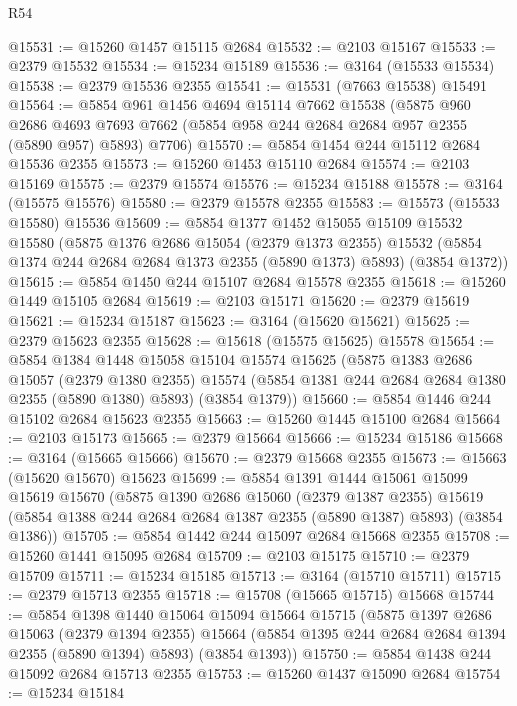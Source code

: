 \begin{lexlean}{R54}
\begin{coremodule}
@15531 := @15260 @1457 @15115 @2684
@15532 := @2103 @15167
@15533 := @2379 @15532
@15534 := @15234 @15189
@15536 := @3164 (@15533 @15534)
@15538 := @2379 @15536 @2355
@15541 := @15531 (@7663 @15538) @15491
@15564 := @5854
    @961
    @1456
    @4694
    @15114
    @7662
    @15538
    (@5875
      @960
      @2686
      @4693
      @7693
      @7662
      (@5854 @958 @244 @2684 @2684 @957 @2355 (@5890 @957) @5893)
      @7706)
@15570 := @5854 @1454 @244 @15112 @2684 @15536 @2355
@15573 := @15260 @1453 @15110 @2684
@15574 := @2103 @15169
@15575 := @2379 @15574
@15576 := @15234 @15188
@15578 := @3164 (@15575 @15576)
@15580 := @2379 @15578 @2355
@15583 := @15573 (@15533 @15580) @15536
@15609 := @5854
    @1377
    @1452
    @15055
    @15109
    @15532
    @15580
    (@5875
      @1376
      @2686
      @15054
      (@2379 @1373 @2355)
      @15532
      (@5854 @1374 @244 @2684 @2684 @1373 @2355 (@5890 @1373) @5893)
      (@3854 @1372))
@15615 := @5854 @1450 @244 @15107 @2684 @15578 @2355
@15618 := @15260 @1449 @15105 @2684
@15619 := @2103 @15171
@15620 := @2379 @15619
@15621 := @15234 @15187
@15623 := @3164 (@15620 @15621)
@15625 := @2379 @15623 @2355
@15628 := @15618 (@15575 @15625) @15578
@15654 := @5854
    @1384
    @1448
    @15058
    @15104
    @15574
    @15625
    (@5875
      @1383
      @2686
      @15057
      (@2379 @1380 @2355)
      @15574
      (@5854 @1381 @244 @2684 @2684 @1380 @2355 (@5890 @1380) @5893)
      (@3854 @1379))
@15660 := @5854 @1446 @244 @15102 @2684 @15623 @2355
@15663 := @15260 @1445 @15100 @2684
@15664 := @2103 @15173
@15665 := @2379 @15664
@15666 := @15234 @15186
@15668 := @3164 (@15665 @15666)
@15670 := @2379 @15668 @2355
@15673 := @15663 (@15620 @15670) @15623
@15699 := @5854
    @1391
    @1444
    @15061
    @15099
    @15619
    @15670
    (@5875
      @1390
      @2686
      @15060
      (@2379 @1387 @2355)
      @15619
      (@5854 @1388 @244 @2684 @2684 @1387 @2355 (@5890 @1387) @5893)
      (@3854 @1386))
@15705 := @5854 @1442 @244 @15097 @2684 @15668 @2355
@15708 := @15260 @1441 @15095 @2684
@15709 := @2103 @15175
@15710 := @2379 @15709
@15711 := @15234 @15185
@15713 := @3164 (@15710 @15711)
@15715 := @2379 @15713 @2355
@15718 := @15708 (@15665 @15715) @15668
@15744 := @5854
    @1398
    @1440
    @15064
    @15094
    @15664
    @15715
    (@5875
      @1397
      @2686
      @15063
      (@2379 @1394 @2355)
      @15664
      (@5854 @1395 @244 @2684 @2684 @1394 @2355 (@5890 @1394) @5893)
      (@3854 @1393))
@15750 := @5854 @1438 @244 @15092 @2684 @15713 @2355
@15753 := @15260 @1437 @15090 @2684
@15754 := @15234 @15184

\end{coremodule}
\end{lexlean}
